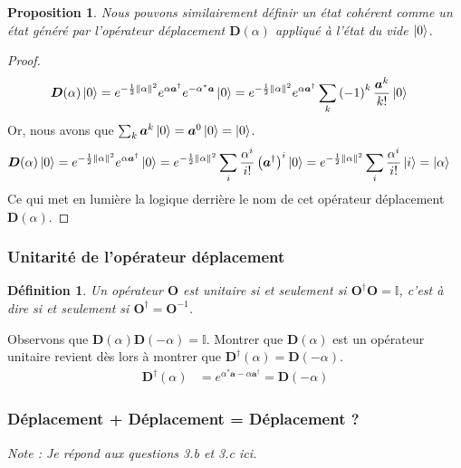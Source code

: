 \documentclass[11pt,oneside,a4paper]{article}
\newtheorem{definition}[theorem]{Définition}
\newtheorem{property}[theorem]{Proposition}
\begin{document}
\begin{property}
  Nous pouvons similairement définir un état cohérent comme un état généré par l'opérateur déplacement $\bm{D}(\alpha)$ appliqué à l'état du vide $\ket{0}$.
\end{property}
\begin{proof}
  \begin{align}
    \bm{D}(\alpha)\ket{0} &=  e^{-\frac{1}{2}\norm{\alpha}^2}e^{\alpha\bm{a}^\dagger}e^{-\alpha^*\bm{a}}\ket{0} = e^{-\frac{1}{2}\norm{\alpha}^2}e^{\alpha\bm{a}^\dagger} \sum_k \left(-1\right)^k \frac{\bm{a}^k}{k!}\ket{0}
  \end{align}
  Or, nous avons que $\sum_k \bm{a}^k\ket{0} = \bm{a}^0\ket{0} = \ket{0}$.
  \begin{align}
    \bm{D}(\alpha)\ket{0} &= e^{-\frac{1}{2}\norm{\alpha}^2}e^{\alpha\bm{a}^\dagger}\ket{0} =  e^{-\frac{1}{2}\norm{\alpha}^2} \sum_i \frac{\alpha^i}{i!}\left(\bm{a}^\dagger\right)^i\ket{0} = e^{-\frac{1}{2}\norm{\alpha}^2} \sum_i \frac{\alpha^i}{i!}\ket{i} = \ket{\alpha}
  \end{align}
  Ce qui met en lumière la logique derrière le nom de cet opérateur déplacement $\bm{D}(\alpha)$.
\end{proof}

\subsubsection{Unitarité de l'opérateur déplacement}

\begin{definition}
  Un opérateur $\bm{O}$ est unitaire si et seulement si $\bm{O}^\dagger\bm{O} = \mathbb{I}$, c'est à dire si et seulement si $\bm{O}^\dagger = \bm{O}^{-1}$.
\end{definition}

Observons que $\bm{D}(\alpha)\bm{D}(-\alpha) = \mathbb{I}$. Montrer que $\bm{D}(\alpha)$ est un opérateur unitaire revient dès lors à montrer que $\bm{D}^\dagger(\alpha) = \bm{D}(-\alpha)$.
\begin{align}
  \bm{D}^\dagger(\alpha) &= e^{\alpha^*\bm{a}-\alpha\bm{a}^\dagger} = \bm{D}(-\alpha) 
\end{align}

\subsubsection{Déplacement + Déplacement = Déplacement ?}
\emph{Note : Je répond aux questions 3.b et 3.c ici.}
\end{document}
